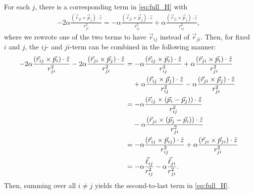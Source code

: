 For each $j$, there is a corresponding term in \cref{eq:full_H} with
\begin{align*}
    -2\alpha \frac{(\vec{r}_{ji}\times\vec{p}_j)\cdot\hat{z}}{r_{ji}^2} = -\alpha \frac{(\vec{r}_{ji}\times\vec{p}_j)\cdot\hat{z}}{r_{ij}^2} + \alpha \frac{(\vec{r}_{ij}\times\vec{p}_j)\cdot\hat{z}}{r_{ij}^2},
\end{align*}
where we rewrote one of the two terms to have $\vec{r}_{ij}$ instead of $\vec{r}_{ji}$. Then, for fixed $i$ and $j$, the $ij$- and $ji$-term can be combined in the following manner:
\begin{align*}
    -2\alpha \frac{(\vec{r}_{ij}\times\vec{p}_i)\cdot\hat{z}}{r_{ji}^2} -2\alpha \frac{(\vec{r}_{ji}\times\vec{p}_j)\cdot\hat{z}}{r_{ji}^2} 
        &= -\alpha \frac{(\vec{r}_{ij}\times\vec{p}_i)\cdot\hat{z}}{r_{ij}^2} + \alpha \frac{(\vec{r}_{ji}\times\vec{p}_i)\cdot\hat{z}}{r_{ji}^2} \\ 
        &\hspace{.375cm} +\alpha \frac{(\vec{r}_{ij}\times\vec{p}_j)\cdot\hat{z}}{r_{ij}^2} - \alpha \frac{(\vec{r}_{ji}\times\vec{p}_j)\cdot\hat{z}}{r_{ji}^2} \\
        &= -\alpha \frac{(\vec{r}_{ij}\times\left( \vec{p}_{i} - \vec{p}_{j} \right))\cdot\hat{z}}{r_{ij}^2} \\
        &\hspace{.375cm} -\alpha \frac{(\vec{r}_{ji}\times\left( \vec{p}_{j} - \vec{p}_{i} \right))\cdot\hat{z}}{r_{ji}^2} \\
        &= -\alpha \frac{(\vec{r}_{ij}\times\vec{p}_{ij})\cdot\hat{z}}{r_{ij}^2} + \alpha \frac{(\vec{r}_{ji}\times\vec{p}_{ji})\cdot\hat{z}}{r_{ji}^2} \\
        &= -\alpha \frac{\vec{\ell}_{ij}}{r_{ij}^2} - \alpha \frac{\vec{\ell}_{ji}}{r_{ji}^2}.
\end{align*}
Then, summing over all $i\neq j$ yields the second-to-last term in \cref{eq:full_H}.